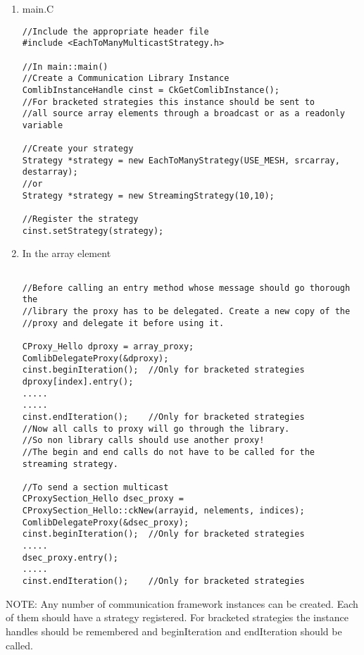 \begin{enumerate}

\item main.C \\
\begin{verbatim}
//Include the appropriate header file
#include <EachToManyMulticastStrategy.h>

//In main::main() 
//Create a Communication Library Instance
ComlibInstanceHandle cinst = CkGetComlibInstance();
//For bracketed strategies this instance should be sent to 
//all source array elements through a broadcast or as a readonly variable

//Create your strategy
Strategy *strategy = new EachToManyStrategy(USE_MESH, srcarray, destarray);
//or
Strategy *strategy = new StreamingStrategy(10,10);

//Register the strategy
cinst.setStrategy(strategy);

\end{verbatim}

\item In the array element \\
\begin{verbatim}

//Before calling an entry method whose message should go thorough the
//library the proxy has to be delegated. Create a new copy of the
//proxy and delegate it before using it.

CProxy_Hello dproxy = array_proxy;
ComlibDelegateProxy(&dproxy);
cinst.beginIteration();  //Only for bracketed strategies
dproxy[index].entry();   
.....
.....
cinst.endIteration();    //Only for bracketed strategies
//Now all calls to proxy will go through the library.
//So non library calls should use another proxy!
//The begin and end calls do not have to be called for the streaming strategy.

//To send a section multicast
CProxySection_Hello dsec_proxy = CProxySection_Hello::ckNew(arrayid, nelements, indices);
ComlibDelegateProxy(&dsec_proxy);
cinst.beginIteration();  //Only for bracketed strategies
.....
dsec_proxy.entry();
.....
cinst.endIteration();    //Only for bracketed strategies

\end{verbatim}
\end{enumerate}

NOTE: Any number of communication framework instances can be
created. Each of them should have a strategy registered. For bracketed
strategies the instance handles should be remembered and
beginIteration and endIteration should be called.

